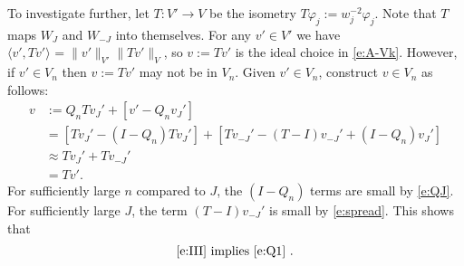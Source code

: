 \documentclass[12pt]{article}
\newcommand{\norm}[2]{\|#1\|_{#2}}
\newcommand{\scalar}[2]{\langle#1\rangle_{#2}}
\newcommand{\from}{\colon}
\begin{document}
	
	To investigate further,
	let $T \from V' \to V$
	be the isometry
	$T \varphi_j := w_j^{-2} \varphi_j$.
	Note that $T$ maps $W_J$ and $W_{-J}$ into themselves.
	For any $v' \in V'$ we have
	$\scalar{v', T v'}{} = \norm{v'}{V'} \norm{T v'}{V}$,
	so $v := T v'$ is the ideal choice in \eqref{e:A-Vk}.
	However,
	if $v' \in V_n$
	then $v := T v'$ may not be in $V_n$.
	Given $v' \in V_n$,
	construct $v \in V_n$ as follows:
	\begin{align}
		v 
		& 
		:=
		Q_n T v_J' + [v' - Q_n v_J']
		\\
		&
		= 
		[T v_J' - (I - Q_n) T v_J'] + 
		[T v_{-J}' - (T - I) v_{-J}' + (I - Q_n) v_J']
		\\
		&
		\approx
		T v_J' + T v_{-J}'
		\\
		&
		= T v'
		.
	\end{align}
	For sufficiently large $n$ compared to $J$,
	the $(I - Q_n)$ terms are small
	by \eqref{e:QJ}.
	For sufficiently large $J$,
	the term $(T - I) v_{-J}'$
	is small 
	by \eqref{e:spread}.
	This shows that
	\begin{align}
		\text{
			\eqref{e:III}
			implies
			\eqref{e:Q1}
			.
		}
	\end{align}
	
	
	
%	
%	
%	
%	
%	
	 
\end{document}
